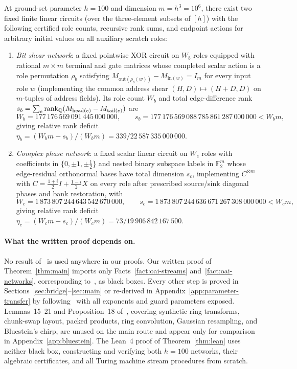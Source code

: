 \begin{fact}\label{fact:oai-networks}
At ground-set parameter $h=100$ and dimension $m=h^3=10^6$, there exist two fixed finite linear circuits (over the
three-element subsets of $[h]$) with the following certified role counts, recursive rank sums, and endpoint actions for
arbitrary initial values on all auxiliary scratch roles:
\begin{enumerate}[label=(\alph*),nosep,leftmargin=*]
  \item \emph{Bit shear network}: a fixed pointwise XOR circuit on $W_b$ roles equipped with rational $m\times m$
    terminal and gate matrices whose completed scalar action is a role permutation $\rho_b$ satisfying
    $M_{\mathrm{out}(\rho_b(w))}-M_{\mathrm{in}(w)}=I_m$ for every input role $w$ (implementing the common address shear
    $(H,D)\mapsto(H+D,D)$ on $m$-tuples of address fields). Its role count $W_b$ and total edge-difference rank
    $s_b=\sum_e\operatorname{rank}_{\mathbb{Q}}(M_{\mathrm{head}(e)}-M_{\mathrm{tail}(e)})$ are
    \[
      W_b=177\,176\,569\,091\,445\,000\,000,\qquad
      s_b=177\,176\,569\,088\,785\,861\,287\,000\,000<W_b m,
    \]
    giving relative rank deficit $\eta_b=(W_b m-s_b)/(W_b m)=339/22\,587\,335\,000\,000$.
  \item \emph{Complex phase network}: a fixed scalar linear circuit on $W_c$ roles with coefficients in
    $\{0,\pm 1,\pm\tfrac12\}$ and nested binary subspace labels in $\mathbb F_2^m$ whose edge-residual orthonormal bases
    have total dimension $s_c$, implementing $C^{\otimes m}$ with $C=\frac{1+i}{2}I+\frac{1-i}{2}X$ on every role after
    prescribed source/sink diagonal phases and bank restoration, with
    \[
      W_c=1\,873\,807\,244\,643\,542\,670\,000,\qquad
      s_c=1\,873\,807\,244\,636\,671\,267\,308\,000\,000<W_c m,
    \]
    giving relative rank deficit $\eta_c=(W_c m-s_c)/(W_c m)=73/19\,906\,842\,167\,500$.
\end{enumerate}
\end{fact}

\paragraph{What the written proof depends on.}
No result of~\cite{HvdH21} is used anywhere in our proofs. Our written proof of Theorem~\ref{thm:main} imports only Facts~\ref{fact:oai-streams} and~\ref{fact:oai-networks}, corresponding to~\cite[Lemmas~3--4 and Props.~7--8]{OAI26}, as black boxes. Every other step is proved in Sections~\ref{sec:bridge}--\ref{sec:main} or re-derived in Appendix~\ref{app:parameter-transfer} by following~\cite[\S\S4--5]{OAI26} with all exponents and guard parameters exposed. Lemmas~15--21 and Proposition~18 of~\cite{OAI26}, covering synthetic ring transforms, chunk-swap layout, packed products, ring convolution, Gaussian resampling, and Bluestein's chirp, are unused on the main route and appear only for comparison in Appendix~\ref{app:bluestein}. The Lean~4 proof of Theorem~\ref{thm:lean} uses neither black box, constructing and verifying both $h=100$ networks, their algebraic certificates, and all Turing machine stream procedures from scratch.

